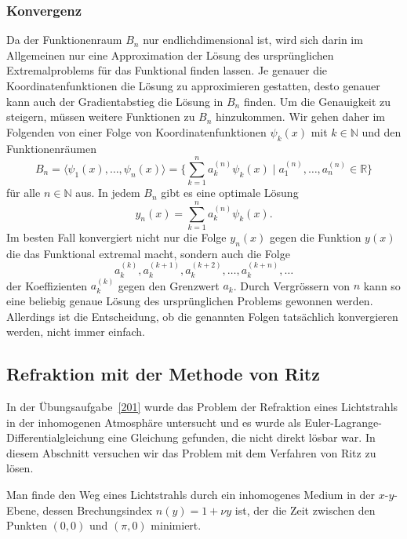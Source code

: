 %
%
\subsubsection{Konvergenz}
Da der Funktionenraum $B_n$ nur endlichdimensional ist, wird sich darin
im Allgemeinen nur eine Approximation der Lösung des ursprünglichen
Extremalproblems für das Funktional finden lassen.
Je genauer die Koordinatenfunktionen die Lösung zu approximieren gestatten,
desto genauer kann auch der Gradientabstieg die Lösung in $B_n$ finden.
Um die Genauigkeit zu steigern, müssen weitere Funktionen zu $B_n$ hinzukommen.
Wir gehen daher im Folgenden von einer Folge von Koordinatenfunktionen
$\psi_k(x)$ mit $k\in \mathbb{N}$ und den Funktionenräumen
\[
B_n
=
\langle \psi_1(x),\dots,\psi_n(x)\rangle
=
\biggl\{
\sum_{k=1}^n a_k^{(n)} \psi_k(x)
\;
\bigg|
\;
a_1^{(n)},\dots,a_n^{(n)}\in\mathbb{R}
\biggr\}
\]
für alle $n\in\mathbb{N}$ aus.
In jedem $B_n$ gibt es eine optimale Lösung
\[
y_n(x)
=
\sum_{k=1}^n a_k^{(n)} \psi_k(x).
\]
Im besten Fall konvergiert nicht nur die Folge $y_n(x)$ gegen die
Funktion $y(x)$ die das Funktional extremal macht, sondern auch
die Folge
\[
a_k^{(k)},
a_k^{(k+1)},
a_k^{(k+2)},
\dots,
a_k^{(k+n)},
\dots
\]
der Koeffizienten $a_k^{(k)}$ gegen den Grenzwert $a_k$.
Durch Vergrössern von $n$ kann so eine beliebig genaue Lösung des
ursprünglichen Problems gewonnen werden.
Allerdings ist die Entscheidung, ob die genannten Folgen tatsächlich
konvergieren werden, nicht immer einfach.

%
%
\subsection{Refraktion mit der Methode von Ritz
\label{buch:direkt:ritz:subsection:refraktion}}
In der Übungsaufgabe~\ref{201} wurde das Problem der Refraktion eines
Lichtstrahls in der inhomogenen Atmosphäre untersucht und es wurde als
Euler-Lagrange-Differentialgleichung eine Gleichung gefunden, die nicht
direkt lösbar war.
In diesem Abschnitt versuchen wir das Problem mit dem Verfahren von Ritz
zu lösen.

\begin{aufgabe}
\label{buch:direkt:ritz:aufgabe:lichtstrahl}
Man finde den Weg eines Lichtstrahls durch ein inhomogenes Medium
in der $x$-$y$-Ebene,
dessen Brechungsindex $n(y)=1+\nu y$ ist, der die Zeit zwischen
den Punkten $(0,0)$ und $(\pi,0)$ minimiert.
\end{aufgabe}

